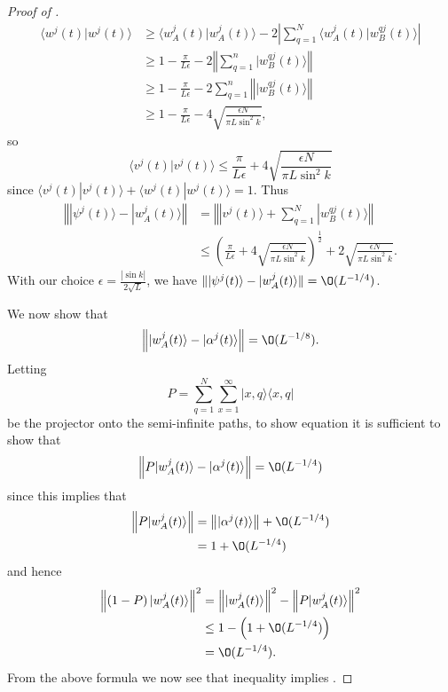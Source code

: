 \documentclass[../thesis-main/thesis-main]{subfiles}
\begin{document}
\begin{proof}[Proof of {}]
\begin{align*}
\langle w^{j}(t)|w^{j}(t)\rangle & \geq \langle w_{A}^{j}(t)|w_{A}^{j}(t)\rangle-2\left|\sum_{q=1}^{N}\langle w_{A}^{j}(t)|w_{B}^{qj}(t)\rangle\right|\\
 & \geq 1-\frac{\pi}{L\epsilon}-2\left\Vert \sum_{q=1}^{n}|w_{B}^{qj}(t)\rangle\right\Vert \\
 & \geq 1-\frac{\pi}{L\epsilon}-2\sum_{q=1}^{n}\left\Vert |w_{B}^{qj}(t)\rangle\right\Vert \\
 & \geq 1-\frac{\pi}{L\epsilon}-4\sqrt{\frac{\epsilon N}{\pi L\sin^{2}k}},\end{align*}
so
\[
\langle v^{j}(t)|v^{j}(t)\rangle\leq\frac{\pi}{L\epsilon}+4\sqrt{\frac{\epsilon N}{\pi L\sin^{2}k}}
\]
since $\langle v^{j}(t)|v^{j}(t)\rangle+\langle w^{j}(t)|w^{j}(t)\rangle=1$.
Thus
\begin{align*}
\left\Vert |\psi^{j}(t)\rangle-|w_{A}^{j}(t)\rangle\right\Vert  & = \left\Vert |v^{j}(t)\rangle+\sum_{q=1}^{N}|w_{B}^{qj}(t)\rangle\right\Vert \\
 & \leq \left(\frac{\pi}{L\epsilon}+4\sqrt{\frac{\epsilon N}{\pi L\sin^{2}k}}\right)^{\frac{1}{2}}+2\sqrt{\frac{\epsilon N}{\pi L\sin^{2}k}}.
\end{align*}
With our choice $\epsilon=\frac{\left|\sin k\right|}{2\sqrt{L}}$,
we have $\norm{|\psi^{j}(t)\rangle-|w_{A}^{j}(t)\rangle} =\O(L^{-{1}/
{4}})$.

We now show that
\begin{equation}
\left\Vert |w_{A}^{j}(t)\rangle-|\alpha^{j}(t)\rangle\right\Vert =\O(L^{-{1}/{8}}).\label{eq:alpha_w_bound}\end{equation}
Letting \[
P=\sum_{q=1}^{N}\sum_{x=1}^{\infty}|x,q\rangle\langle x,q|\]
be the projector onto the semi-infinite paths, to show equation 
it is sufficient to show that
\begin{equation}
\left\Vert P|w_{A}^{j}(t)\rangle-|\alpha^{j}(t)\rangle\right\Vert = \O(L^{-{1}/{4}})
\label{eq:bound_inside_lines}
\end{equation}
since this implies that
\begin{align*}
\left\Vert P|w_{A}^{j}(t)\rangle\right\Vert  & = \left\Vert |\alpha^{j}(t)\rangle\right\Vert + \O(L^{-{1}/{4}})\\
 & = 1+\O(L^{-{1}/{4}})
\end{align*}
and hence
\begin{align}
\left\Vert \left(1-P\right)|w_{A}^{j}(t)\rangle\right\Vert ^{2} & = \left\Vert |w_{A}^{j}(t)\rangle\right\Vert ^{2}-\left\Vert P|w_{A}^{j}(t)\rangle\right\Vert ^{2}\nonumber \\
 & \leq 1-\left(1+\O(L^{-{1}/{4}})\right)\nonumber \\
 & = \O(L^{-{1}/{4}}).\label{eq:bound_outside_lines}
\end{align}
From the above formula we now see that inequality 
implies .


\end{proof}
\end{document}
